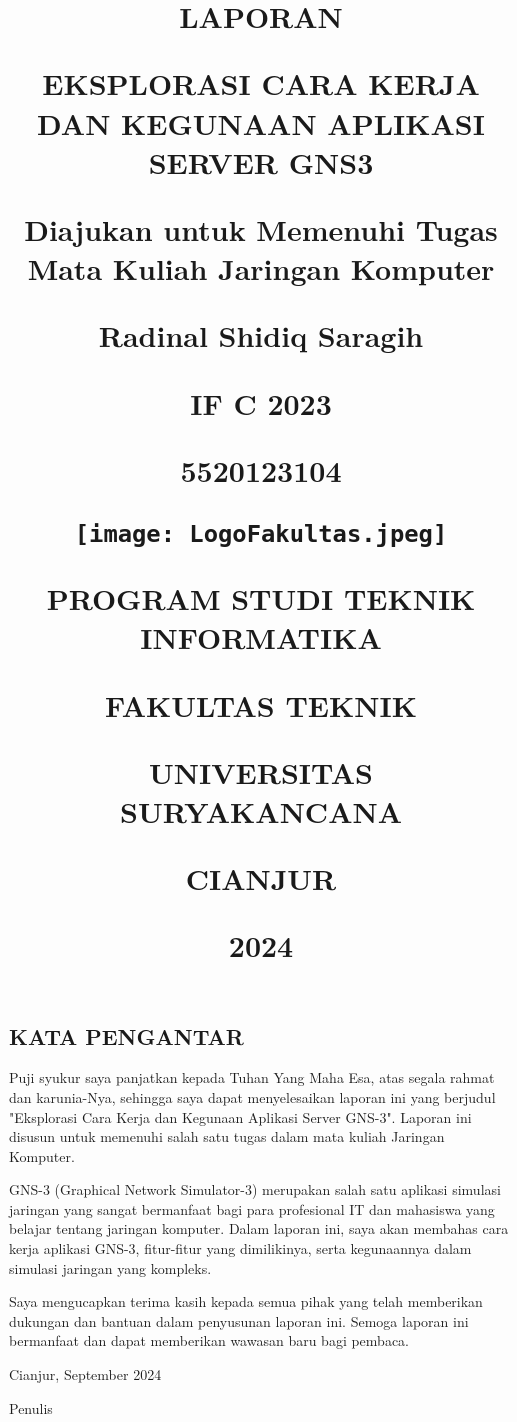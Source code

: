\documentclass[12pt, a4paper]{article}
\date{}
\title{

  \large{\textbf{LAPORAN}}

  \large{\textbf{EKSPLORASI CARA KERJA DAN KEGUNAAN APLIKASI SERVER GNS3}}

  {\large{Diajukan untuk Memenuhi Tugas Mata Kuliah Jaringan Komputer}}

  {\vspace{1cm}}

  \normalsize{Radinal Shidiq Saragih}

  {\vspace{0.5cm}}

  \normalsize{IF C 2023}

  {\vspace{0.5cm}}

  \normalsize{5520123104}

  {\vspace{1cm}}

  {\texttt{[image: LogoFakultas.jpeg]}}

  {\vspace{2cm}}

  {\large{PROGRAM STUDI TEKNIK INFORMATIKA}}

  {\large{FAKULTAS TEKNIK}}

  {\large{UNIVERSITAS SURYAKANCANA}}

  {\large{CIANJUR}}

  {\small{2024}}
}
\begin{document}
  \begin{titlepage}
    \maketitle
  \end{titlepage}


  \begin{center}
    \section*{KATA PENGANTAR}
  \end{center}

  \setcounter{section}{1}

  \setcounter{subsection}{0}


  \vspace{1cm}


  Puji syukur saya panjatkan kepada Tuhan Yang Maha Esa, atas segala rahmat dan
  karunia-Nya, sehingga saya dapat menyelesaikan laporan ini yang berjudul
  "Eksplorasi Cara Kerja dan Kegunaan Aplikasi Server GNS-3".
  Laporan ini disusun untuk memenuhi salah satu tugas dalam mata kuliah
  Jaringan Komputer.


  GNS-3 (Graphical Network Simulator-3) merupakan salah satu aplikasi
  simulasi jaringan yang sangat bermanfaat bagi para profesional IT dan mahasiswa
  yang belajar tentang jaringan komputer. Dalam laporan ini, saya akan membahas
  cara kerja aplikasi GNS-3, fitur-fitur yang dimilikinya, serta kegunaannya
  dalam simulasi jaringan yang kompleks.


  Saya mengucapkan terima kasih kepada semua pihak yang telah memberikan dukungan
  dan bantuan dalam penyusunan laporan ini. Semoga laporan ini bermanfaat dan
  dapat memberikan wawasan baru bagi pembaca.

  \vspace{1cm}

  \begin{flushright}
    Cianjur, September 2024

    \vspace{0.5cm}

    Penulis
  \end{flushright}

  \newpage

  \renewcommand\contentsname {\Large{\textbf{DAFTAR ISI}} }
\end{document}
